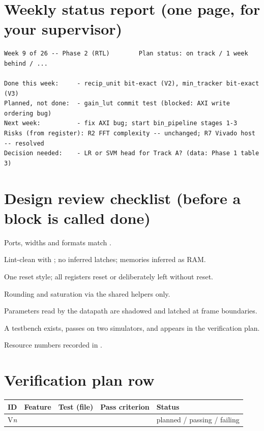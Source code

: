 \section*{Weekly status report (one page, for your supervisor)}
\begin{lstlisting}[style=plain]
Week 9 of 26 -- Phase 2 (RTL)        Plan status: on track / 1 week behind / ...

Done this week:     - recip_unit bit-exact (V2), min_tracker bit-exact (V3)
Planned, not done:  - gain_lut commit test (blocked: AXI write ordering bug)
Next week:          - fix AXI bug; start bin_pipeline stages 1-3
Risks (from register): R2 FFT complexity -- unchanged; R7 Vivado host -- resolved
Decision needed:    - LR or SVM head for Track A? (data: Phase 1 table 3)
\end{lstlisting}

\section*{Design review checklist (before a block is called done)}
\begin{checklist}
  \item Ports, widths and formats match .
  \item Lint-clean with ; no inferred latches; memories inferred as RAM.
  \item One reset style; all registers reset or deliberately left without reset.
  \item Rounding and saturation via the shared helpers only.
  \item Parameters read by the datapath are shadowed and latched at frame boundaries.
  \item A testbench exists, passes on two simulators, and appears in the verification plan.
  \item Resource numbers recorded in .
\end{checklist}

\section*{Verification plan row}
\begin{center}\footnotesize
\begin{tabularx}{\textwidth}{@{}lLLLl@{}}
\toprule
ID & Feature & Test (file) & Pass criterion & Status \\
\midrule
V\textit{n} & &  & & planned / passing / failing \\
\bottomrule
\end{tabularx}
\end{center}


